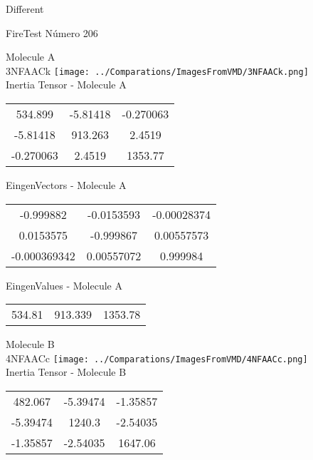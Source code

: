 \begin{center}
\vtab
\vtab
\textcolor{NavyBlue}{\Large Different}
\end{center}

 \newpage

\vtab[-2cm]
\begin{center}
{\large FireTest \tab Número 206}
\end{center}
\begin{multicols}{2}
\begin{center}

Molecule A \\ 
3NFAACk
\texttt{[image: ../Comparations/ImagesFromVMD/3NFAACk.png]}
\\
Inertia Tensor - Molecule A \\
\vtab

\begin{tabular}{|c c c|}
534.899	 & 	-5.81418	 & 	-0.270063	 \\
-5.81418	 & 	913.263	 & 	2.4519	 \\
-0.270063	 & 	2.4519	 & 	1353.77
\end{tabular}

\vtab
 EingenVectors - Molecule A     \\
\vtab
\begin{tabular}{|c c c|}
-0.999882	 & 	-0.0153593	 & 	-0.00028374	 \\
0.0153575	 & 	-0.999867	 & 	0.00557573	 \\
-0.000369342	 & 	0.00557072	 & 	0.999984
\end{tabular}

\vtab
 EingenValues - Molecule A     \\
\vtab
\begin{tabular}{|c c c|}
534.81	 & 	913.339	 & 	1353.78	 \\
\end{tabular}
\columnbreak

Molecule B \\ 
4NFAACc
\texttt{[image: ../Comparations/ImagesFromVMD/4NFAACc.png]}
\\
Inertia Tensor - Molecule B \\
\vtab

\begin{tabular}{|c c c|}
482.067	 & 	-5.39474	 & 	-1.35857	 \\
-5.39474	 & 	1240.3	 & 	-2.54035	 \\
-1.35857	 & 	-2.54035	 & 	1647.06
\end{tabular}


\end{center}
\end{multicols}
